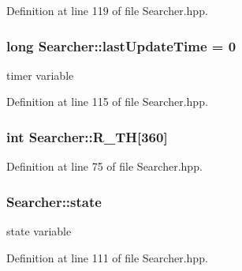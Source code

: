 Definition at line 119 of file Searcher.\-hpp.

\hypertarget{classSearcher_a91de3c7ecdda8d3a6d231c35fbf363c5}{
\subsubsection[{last\-Update\-Time}]{\setlength{\rightskip}{0pt plus 5cm}long Searcher\-::last\-Update\-Time = 0\hspace{0.3cm}{\ttfamily [private]}}}\label{classSearcher_a91de3c7ecdda8d3a6d231c35fbf363c5}


timer variable 



Definition at line 115 of file Searcher.\-hpp.

\hypertarget{classSearcher_ab21f940dc1ed76c01611be56b95961e1}{
\subsubsection[{R\-\_\-\-T\-H}]{\setlength{\rightskip}{0pt plus 5cm}int Searcher\-::\-R\-\_\-\-T\-H\mbox{[}360\mbox{]}\hspace{0.3cm}{\ttfamily [private]}}}\label{classSearcher_ab21f940dc1ed76c01611be56b95961e1}


Definition at line 75 of file Searcher.\-hpp.

\hypertarget{classSearcher_aadc83ce2d77610d6572f98ecd8b4d6e4}{
\subsubsection[{state}]{ Searcher\-::state\hspace{0.3cm}{\ttfamily [private]}}}\label{classSearcher_aadc83ce2d77610d6572f98ecd8b4d6e4}


state variable 



Definition at line 111 of file Searcher.\-hpp.


